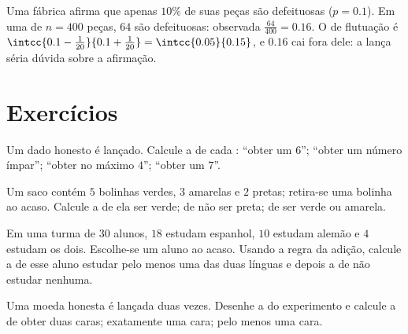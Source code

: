 \begin{example}\label{ex:g10:proba:test}
Uma fábrica afirma que apenas $10\%$ de suas peças são defeituosas
($p = 0.1$). Em uma  de $n = 400$ peças, $64$ são defeituosas:
 observada $\frac{64}{400} = 0.16$. O  de flutuação é
$\intcc{0.1 - \frac{1}{20}}{0.1 + \frac{1}{20}} = \intcc{0.05}{0.15}$, e
$0.16$ cai fora dele: a  lança séria dúvida sobre a afirmação.
\end{example}

\section{Exercícios}

\begin{exercise}[$\star$]\label{exo:g10:proba:1}
Um dado honesto é lançado. Calcule a  de cada :
``obter um $6$''; ``obter um número ímpar''; ``obter no máximo $4$'';
``obter um $7$''.
\end{exercise}

\begin{exercise}[$\star$]\label{exo:g10:proba:2}
Um saco contém $5$ bolinhas verdes, $3$ amarelas e $2$ pretas; retira-se
uma bolinha ao acaso. Calcule a  de ela ser verde; de não
ser preta; de ser verde ou amarela.
\end{exercise}

\begin{exercise}[$\star$]\label{exo:g10:proba:3}
Em uma turma de $30$ alunos, $18$ estudam espanhol, $10$ estudam alemão e
$4$ estudam os dois. Escolhe-se um aluno ao acaso. Usando a regra da
adição, calcule a  de esse aluno estudar pelo menos uma das
duas línguas e depois a  de não estudar nenhuma.
\end{exercise}

\begin{exercise}[$\star$]\label{exo:g10:proba:4}
Uma moeda honesta é lançada duas vezes. Desenhe a  do experimento e
calcule a  de obter duas caras; exatamente uma cara; pelo
menos uma cara.
\end{exercise}


